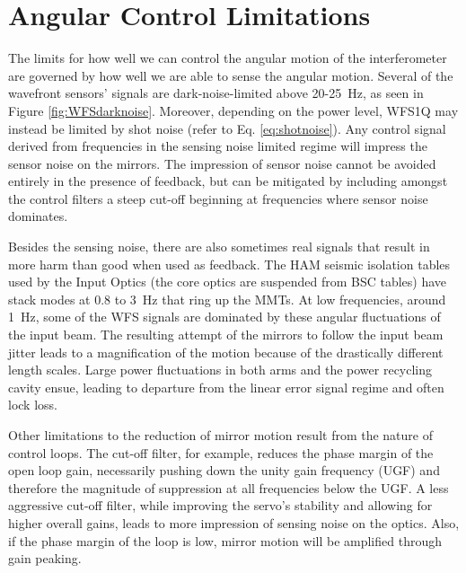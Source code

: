 \section{Angular Control Limitations}
\label{sec:ASClimits}
The limits for how well we can control the angular motion of the interferometer are governed by how well we are able to sense the angular motion. Several of the wavefront sensors' signals are dark-noise-limited above 20-25~Hz, as seen in Figure \ref{fig:WFSdarknoise}. Moreover, depending on the power level, WFS1Q may instead be limited by shot noise (refer to Eq. \ref{eq:shotnoise}). Any control signal derived from frequencies in the sensing noise limited regime will impress the sensor noise on the mirrors. The impression of sensor noise cannot be avoided entirely in the presence of feedback, but can be mitigated by including amongst the control filters a steep cut-off beginning at frequencies where sensor noise dominates. 

Besides the sensing noise, there are also sometimes real signals that result in more harm than good when used as feedback. The HAM seismic isolation tables used by the Input Optics (the core optics are suspended from BSC tables) have stack modes at 0.8 to 3~Hz that ring up the MMTs.  At low frequencies, around 1~Hz, some of the WFS signals are dominated by these angular fluctuations of the input beam. The resulting attempt of the mirrors to follow the input beam jitter leads to a magnification of the motion because of the drastically different length scales. Large power fluctuations in both arms and the power recycling cavity ensue, leading to departure from the linear error signal regime and often lock loss. 

Other limitations to the reduction of mirror motion result from the nature of control loops. The cut-off filter, for example, reduces the phase margin of the open loop gain, necessarily pushing down the unity gain frequency (UGF) and therefore the magnitude of suppression at all frequencies below the UGF. A less aggressive cut-off filter, while improving the servo's stability and allowing for higher overall gains, leads to more impression of sensing noise on the optics. Also, if the phase margin of the loop is low, mirror motion will be amplified through gain peaking.






